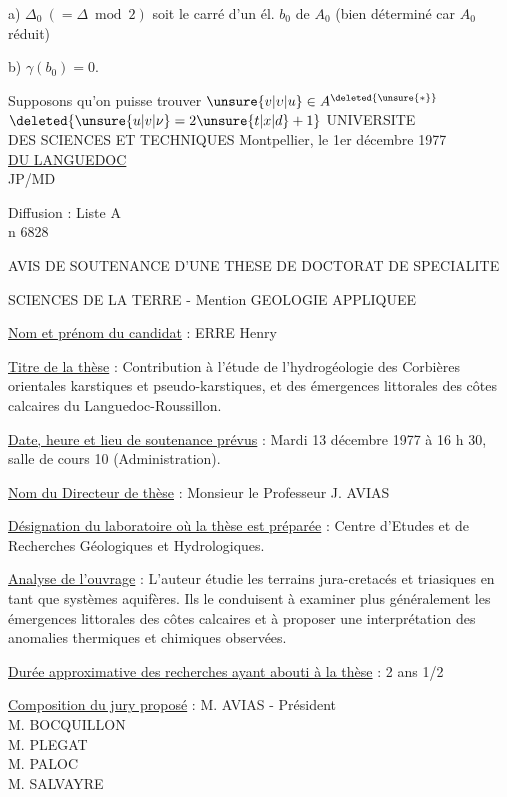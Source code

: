 a) $\Delta_0\ (= \Delta\bmod2)$ soit le carré d'un él. $b_0$ de $A_0$ (bien déterminé car $A_0$ réduit)

b) $\gamma(b_0)=0$.

Supposons qu'on puisse trouver  $\unsure{v|\upsilon|u}\in A^{\deleted{\unsure{*}}}$  $\deleted{\unsure{u|v|\nu}=2\unsure{t|x|d}+1}$ 
UNIVERSITE\\
DES SCIENCES ET TECHNIQUES \hfill Montpellier, le 1er décembre 1977\\
\uline{DU LANGUEDOC}\\
JP/MD

Diffusion : Liste A\\
n\textdegree{} 6828

AVIS DE SOUTENANCE D'UNE THESE DE DOCTORAT DE SPECIALITE

SCIENCES DE LA TERRE - Mention GEOLOGIE APPLIQUEE

\uline{Nom et prénom du candidat} : ERRE Henry

\uline{Titre de la thèse} : Contribution à l'étude de l'hydrogéologie des Corbières orientales karstiques et pseudo-karstiques, et des émergences littorales des côtes calcaires du Languedoc-Roussillon.

\uline{Date, heure et lieu de soutenance prévus} : Mardi 13 décembre 1977 à 16 h 30, salle de cours 10 (Administration).

\uline{Nom du Directeur de thèse} : Monsieur le Professeur J. AVIAS

\uline{Désignation du laboratoire où la thèse est préparée} : Centre d'Etudes et de Recherches Géologiques et Hydrologiques.

\uline{Analyse de l'ouvrage} : L'auteur étudie les terrains jura-cretacés et triasiques en tant que systèmes aquifères. Ils le conduisent à examiner plus généralement les émergences littorales des côtes calcaires et à proposer une interprétation des anomalies thermiques et chimiques observées.

\uline{Durée approximative des recherches ayant abouti à la thèse} : 2 ans 1/2

\uline{Composition du jury proposé} : M. AVIAS - Président\\
\hspace*{7em}M. BOCQUILLON\\
\hspace*{7em}M. PLEGAT\\
\hspace*{7em}M. PALOC\\
\hspace*{7em}M. SALVAYRE

